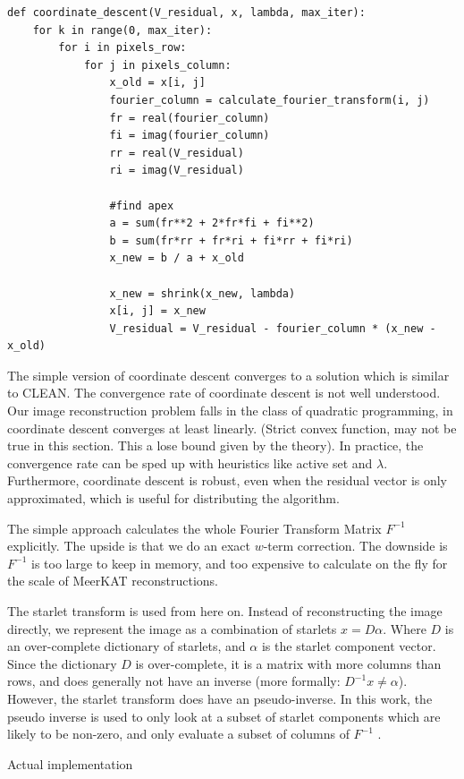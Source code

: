 \begin{lstlisting} 
def coordinate_descent(V_residual, x, lambda, max_iter):
	for k in range(0, max_iter):
		for i in pixels_row:
			for j in pixels_column:
				x_old = x[i, j]
				fourier_column = calculate_fourier_transform(i, j)
				fr = real(fourier_column)
				fi = imag(fourier_column)
				rr = real(V_residual)
				ri = imag(V_residual)
				
				#find apex
				a = sum(fr**2 + 2*fr*fi + fi**2)
				b = sum(fr*rr + fr*ri + fi*rr + fi*ri)
				x_new = b / a + x_old
				
				x_new = shrink(x_new, lambda)
				x[i, j] = x_new
				V_residual = V_residual - fourier_column * (x_new - x_old)
\end{lstlisting}\label{cd:basic}

The simple version of coordinate descent converges to a solution which is similar to CLEAN. The convergence rate of coordinate descent is not well understood. Our image reconstruction problem falls in the class of quadratic programming, in coordinate descent converges at least linearly\cite{luo1992convergence}. (Strict convex function, may not be true in this section. This a lose bound given by the theory). In practice, the convergence rate can be sped up with heuristics like active set\cite{activeset} and $\lambda$\cite{lambda}. Furthermore, coordinate descent is robust, even when the residual vector is only approximated, which is useful for distributing the algorithm.

The simple approach calculates the whole Fourier Transform Matrix $F^{-1}$ explicitly. The upside is that we do an exact $w$-term correction. The downside is $F^{-1}$ is too large to keep in memory, and too expensive to calculate on the fly for the scale of MeerKAT reconstructions. 

The starlet transform is used from here on. Instead of reconstructing the image directly, we represent the image as a combination of starlets $x = D\alpha$. Where $D$ is an over-complete dictionary of starlets, and $\alpha$ is the starlet component vector. Since the dictionary $D$ is over-complete, it is a matrix with more columns than rows, and does generally not have an inverse (more formally: $D^{-1}x \neq \alpha$). However, the starlet transform does have an pseudo-inverse. In this work, the pseudo inverse is used to only look at a subset of starlet components which are likely to be non-zero, and only evaluate a subset of columns of $F^{-1}$ .

Actual implementation

